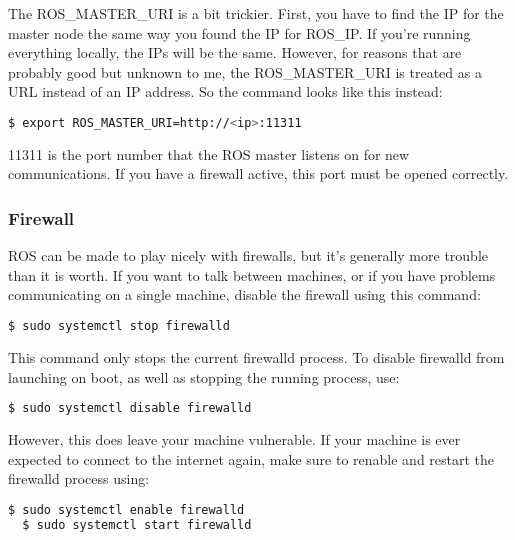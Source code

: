 The ROS\_MASTER\_URI is a bit trickier. First, you have to find the IP for the master node the same way you found the IP for ROS\_IP. If you're running everything locally, the IPs will be the same. However, for reasons that are probably good but unknown to me, the ROS\_MASTER\_URI is treated as a URL instead of an IP address. So the command looks like this instead:

\begin{lstlisting}[language=bash]
  $ export ROS_MASTER_URI=http://<ip>:11311
\end{lstlisting} 

11311 is the port number that the ROS master listens on for new communications. If you have a firewall active, this port must be opened correctly.

\subsubsection{Firewall}

ROS can be made to play nicely with firewalls, but it's generally more trouble than it is worth. If you want to talk between machines, or if you have problems communicating on a single machine, disable the firewall using this command:

\begin{lstlisting}[language=bash]
  $ sudo systemctl stop firewalld
\end{lstlisting}

This command only stops the current firewalld process. To disable firewalld from launching on boot, as well as stopping the running process, use:

\begin{lstlisting}[language=bash]
  $ sudo systemctl disable firewalld
\end{lstlisting} 

However, this does leave your machine vulnerable. If your machine is ever expected to connect to the internet again, make sure to renable and restart the firewalld process using:

\begin{lstlisting}[language=bash]
  $ sudo systemctl enable firewalld
  $ sudo systemctl start firewalld
\end{lstlisting} 





